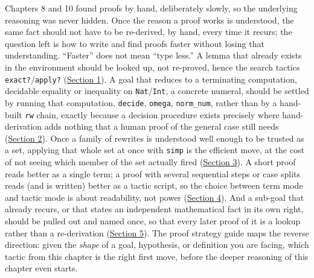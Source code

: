 Chapters 8 and 10 found proofs by hand, deliberately slowly, so the underlying reasoning was never hidden. Once the reason a proof works is understood, the same fact should not have to be re-derived, by hand, every time it recurs; the question left is how to write and find proofs faster without losing that understanding. ``Faster'' does not mean ``type less.'' A lemma that already exists in the environment should be looked up, not re-proved, hence the search tactics \texttt{exact?}/\texttt{apply?} (\hyperref[sec:13-working-efficiently:01-search-tactics:1]{Section 1}). A goal that reduces to a terminating computation, decidable equality or inequality on \texttt{Nat}/\texttt{Int}, a concrete numeral, should be settled by running that computation, \texttt{decide}, \texttt{omega}, \texttt{norm\_\allowbreak{}num}, rather than by a hand-built \texttt{rw} chain, exactly because a decision procedure exists precisely where hand-derivation adds nothing that a human proof of the general case still needs (\hyperref[sec:13-working-efficiently:02-decision-procedures:1]{Section 2}). Once a family of rewrites is understood well enough to be trusted as a set, applying that whole set at once with \texttt{simp} is the efficient move, at the cost of not seeing which member of the set actually fired (\hyperref[sec:13-working-efficiently:03-simp:1]{Section 3}). A short proof reads better as a single term; a proof with several sequential steps or case splits reads (and is written) better as a tactic script, so the choice between term mode and tactic mode is about readability, not power (\hyperref[sec:13-working-efficiently:04-term-vs-tactic-mode:1]{Section 4}). And a sub-goal that already recurs, or that states an independent mathematical fact in its own right, should be pulled out and named once, so that every later proof of it is a lookup rather than a re-derivation (\hyperref[sec:13-working-efficiently:05-structuring-lemmas:1]{Section 5}). The proof strategy guide maps the reverse direction: given the \emph{shape} of a goal, hypothesis, or definition you are facing, which tactic from this chapter is the right first move, before the deeper reasoning of this chapter even starts.








